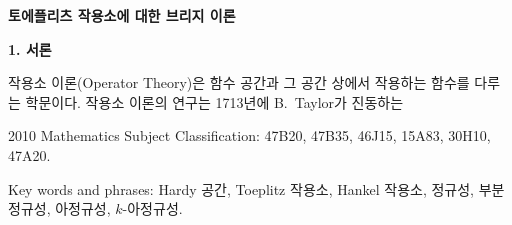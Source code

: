 \documentclass[12pt,a4paper,2sided]{article}
\begin{document}
 \vspace{1.5cm}

\centerline{\Large{\bf 토에플리츠 작용소에 대한 브리지 이론}}
\vspace{1.5 cm} 

\vspace{.5 cm}
\begin{abstract}
Toeplitz 작용소는 수학과 물리학의 다양한 문제에서 자연스럽게
발생한다. 또한 아정규와 부분정규 작용소 이론은 오늘날 광범위하게 잘
발달된 분야로 성장하였으며 함수해석학, 작용소 이론, 수리물리학 등의
많은 문제를 푸는 데 지대한 기여를 해왔다. 따라서, Toeplitz 작용소에
대한 아정규성과 부분정규성을 상세하게 묘사하는 것은 매우 중요한
문제로 떠올랐다. 그런 의미에서 다음 질문은 흥미롭고 매력적이다: {\it
어떤 Toeplitz 작용소가 아정규이거나 부분정규인가?} 정규성과
부분정규성에 대한 정확한 관계가 광범위하게 연구되어 온 반면에,
아정규성 안에서의 부분정규성의 위치에 관한 연구는 여전히 이해가
부족한 편이다. 무한차원 복소 Hilbert (혹은 Banach) 공간 상의
유계작용소에 관한 아정규성과 부분정규성 사이의 틈을 연구하는 분야를
`브리지 이론'이라 부르는데, 이 글에서는 Toeplitz 작용소에 대한
브리지 이론의 발전을 설명한다. 이는 1970년에 P.\,R.\ Halmos가 제시한
열 개의 문제 중 다음과 같은 다섯번째 문제로부터 야기된다: {\it 모든
부분정규 Toeplitz 작용소는 정규이거나 해석적인가?}
\end{abstract}

\vspace{.5 cm} {\large\bf 1. 서론}

\vspace{.5 cm}

작용소 이론(Operator Theory)은 함수 공간과 그 공간 상에서 작용하는
함수를 다루는 학문이다. 작용소 이론의 연구는 1713년에 B.\ Taylor가
진동하는\linebreak

\vspace{.5 cm} \footnoterule

\vspace{.2 cm} {\footnotesize 2010 Mathematics Subject
Classification: 47B20, 47B35, 46J15, 15A83, 30H10, 47A20.

Key words and phrases: Hardy 공간, Toeplitz 작용소, Hankel 작용소,
정규성, 부분정규성, 아정규성, $k$-아정규성.}

\newpage

  \vspace{0.8cm}
\end{document}
